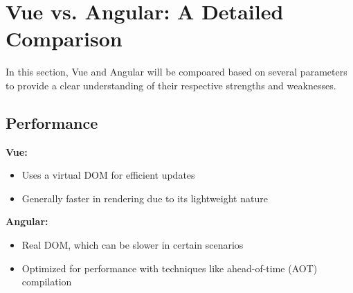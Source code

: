 



\newpage

\section{Vue vs. Angular: A Detailed Comparison}

In this section, Vue and Angular will be compoared based on several parameters to provide a clear understanding of their respective strengths and weaknesses.

\subsection{Performance}

\textbf{Vue:}
\begin{itemize}
    \item Uses a virtual DOM for efficient updates
    \item Generally faster in rendering due to its lightweight nature
\end{itemize}

\textbf{Angular:}
\begin{itemize}
    \item Real DOM, which can be slower in certain scenarios
    \item Optimized for performance with techniques like ahead-of-time (AOT) compilation
\end{itemize}

